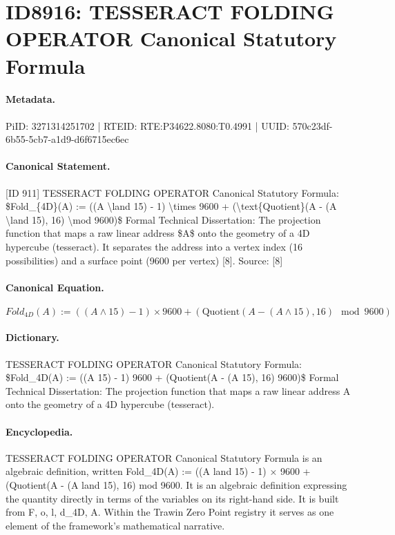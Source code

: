 \section*{ID8916: TESSERACT FOLDING OPERATOR Canonical Statutory Formula}
\paragraph{Metadata.}
PiID: 3271314251702 | RTEID: RTE:P34622.8080:T0.4991 | UUID: 570c23df-6b55-5cb7-a1d9-d6f6715ec6ec

\paragraph{Canonical Statement.}
[ID 911] TESSERACT FOLDING OPERATOR Canonical Statutory Formula: \$Fold\_\{4D\}(A) := ((A \textbackslash{}land 15) - 1) \textbackslash{}times 9600 + (\textbackslash{}text\{Quotient\}(A - (A \textbackslash{}land 15), 16) \textbackslash{}mod 9600)\$ Formal Technical Dissertation: The projection function that maps a raw linear address \$A\$ onto the geometry of a 4D hypercube (tesseract). It separates the address into a vertex index (16 possibilities) and a surface point (9600 per vertex) [8]. Source: [8]

\paragraph{Canonical Equation.}
\[
Fold_{4D}(A) := ((A \land 15) - 1) \times 9600 + (\text{Quotient}(A - (A \land 15), 16) \mod 9600)
\]

\paragraph{Dictionary.}
TESSERACT FOLDING OPERATOR Canonical Statutory Formula: \$Fold\_4D(A) := ((A 15) - 1) 9600 + (Quotient(A - (A 15), 16) 9600)\$ Formal Technical Dissertation: The projection function that maps a raw linear address A onto the geometry of a 4D hypercube (tesseract).

\paragraph{Encyclopedia.}
TESSERACT FOLDING OPERATOR Canonical Statutory Formula is an algebraic definition, written Fold\_4D(A) := ((A land 15) - 1) × 9600 + (Quotient(A - (A land 15), 16) mod 9600. It is an algebraic definition expressing the quantity directly in terms of the variables on its right-hand side. It is built from F, o, l, d\_4D, A. Within the Trawin Zero Point registry it serves as one element of the framework's mathematical narrative.
